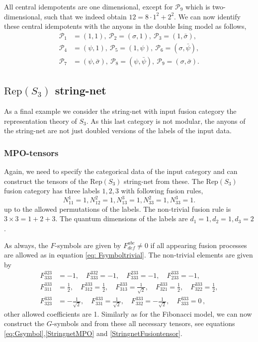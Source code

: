 \documentclass[12 pt]{article}
\begin{document}
All central idempotents are one dimensional, except for $\mathcal{P}_9$ which is two-dimensional, such that we indeed obtain $12=8 \cdot 1^2 + 2^2$. We can now identify these central idempotents with the anyons in the double Ising model as follows,
\begin{align*}
\mathcal{P}_1&=(1,1),\: \mathcal{P}_2=(\sigma,1),\: \mathcal{P}_3=(1,\bar{\sigma}),\\
\mathcal{P}_4&=(\psi,1),\: \mathcal{P}_5=(1,\psi),\: \mathcal{P}_6=(\sigma,\bar{\psi}),\\
 \mathcal{P}_7&=(\psi,\bar{\sigma}),\: \mathcal{P}_8=(\psi,\bar{\psi}),\: \mathcal{P}_9=(\sigma,\bar{\sigma}).
\end{align*}

\subsection{$\text{Rep}(S_3)$ string-net}
As a final example we consider the string-net with input fusion category the representation theory of $S_3$. As this last category is not modular, the anyons of the string-net are not just doubled versions of the labels of the input data.

\subsubsection{MPO-tensors}
Again, we need to specify the categorical data of the input category and can construct the tensors of the $\text{Rep}(S_3)$ string-net from these. The $\text{Rep}(S_3)$ fusion category has three labels $1,2,3$ with following fusion rules,
$$
N_{11}^1=1, N_{12}^2=1, N_{13}^3=1, N_{33}^2=1, N_{33}^3=1.
$$
up to the allowed permutations of the labels. The non-trivial fusion rule is $3 \times 3 = 1 + 2 + 3$. The quantum dimensions of the labels are $d_1=1, d_2=1, d_3=2$.


As always, the $F$-symbols are given by $F^{abc}_{def} \neq 0 $ if all appearing fusion processes are allowed as in equation \eqref{eq: Fsymboltrivial}. The non-trivial elements are given by
\begin{align*}
F^{323}_{333}&=-1,\quad F^{332}_{333}=-1,\quad F^{233}_{333}=-1,\quad F^{333}_{233}=-1,\\
F^{333}_{311}&=\frac{1}{2},\quad
F^{333}_{312}=\frac{1}{2}, \quad
F^{333}_{313}=\frac{1}{\sqrt{2}},\quad
F^{333}_{321}=\frac{1}{2},\quad
F^{333}_{322}=\frac{1}{2},\\
F^{333}_{323}&=-\frac{1}{\sqrt{2}},\quad
F^{333}_{331}=\frac{1}{\sqrt{2}},\quad
F^{333}_{332}=-\frac{1}{\sqrt{2}},\quad
F^{333}_{333}=0\, ,
\end{align*}
other allowed coefficients are 1. Similarly as for the Fibonacci model, we can now construct the $G$-symbols and from these all necessary tensors, see equations \eqref{eq:Gsymbol},\eqref{StringnetMPO} and \eqref{StringnetFusiontensor}.
\end{document}
